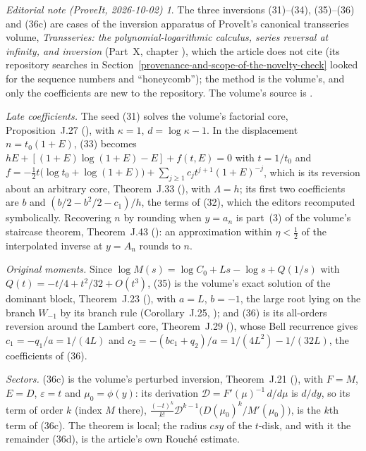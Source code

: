 \documentclass[11pt,letterpaper]{article}
\theoremstyle{remark}
\newtheorem*{ednote}{Editorial note (ProveIt, 2026-10-02)}
\begin{document}
\begin{ednote}
The three inversions (31)--(34), (35)--(36) and (36c) are cases of the
inversion apparatus of ProveIt's canonical transseries volume,
\emph{Transseries: the polynomial-logarithmic calculus, series reversal
at infinity, and inversion} (Part~X, chapter ), which
the article does not cite (its repository searches in
Section~\ref{provenance-and-scope-of-the-novelty-check} looked for the
sequence numbers and ``honeycomb''); the method is the volume's, and only
the coefficients are new to the repository. The volume's source is
.

\emph{Late coefficients.} The seed (31) solves the volume's factorial core,
Proposition~J.27 (), with \(\kappa=1\),
\(d=\log\kappa-1\). In the displacement \(n=t_0(1+E)\), (33) becomes
\(hE+[(1+E)\log(1+E)-E]+f(t,E)=0\) with \(t=1/t_0\) and
\(f=-\tfrac12t\bigl(\log t_0+\log(1+E)\bigr)+\sum_{j\ge1}c_jt^{j+1}(1+E)^{-j}\),
which is its reversion about an arbitrary core, Theorem~J.33
(), with \(\Lambda=h\); its first two
coefficients are \(b\) and \((b/2-b^2/2-c_1)/h\), the terms of (32), which
the editors recomputed symbolically. Recovering \(n\) by rounding when
\(y=a_n\) is part~(3) of the volume's staircase theorem, Theorem~J.43
(): an approximation within \(\eta<\tfrac12\) of the
interpolated inverse at \(y=A_n\) rounds to \(n\).

\emph{Original moments.} Since \(\log M(s)=\log C_0+Ls-\log s+Q(1/s)\)
with \(Q(t)=-t/4+t^2/32+O(t^3)\), (35) is the volume's exact solution of
the dominant block, Theorem~J.23 (), with
\(a=L\), \(b=-1\), the large root lying on the branch \(W_{-1}\) by its
branch rule (Corollary~J.25, ); and (36) is its
all-orders reversion around the Lambert core, Theorem~J.29
(), whose Bell recurrence gives
\(c_1=-q_1/a=1/(4L)\) and \(c_2=-(bc_1+q_2)/a=1/(4L^2)-1/(32L)\), the
coefficients of (36).

\emph{Sectors.} (36c) is the volume's perturbed inversion, Theorem~J.21
(), with \(F=M\), \(E=D\),
\(\varepsilon=t\) and \(\mu_0=\phi(y)\): its derivation
\(\mathcal D=F'(\mu)^{-1}\,d/d\mu\) is \(d/dy\), so its term of order
\(k\) (index \(M\) there),
\(\frac{(-t)^k}{k!}\mathcal D^{k-1}\bigl(D(\mu_0)^k/M'(\mu_0)\bigr)\), is
the \(k\)th term of (36c). The theorem is local; the radius \(csy\) of the
\(t\)-disk, and with it the remainder (36d), is the article's own Rouché
estimate.
\end{ednote}
\end{document}
